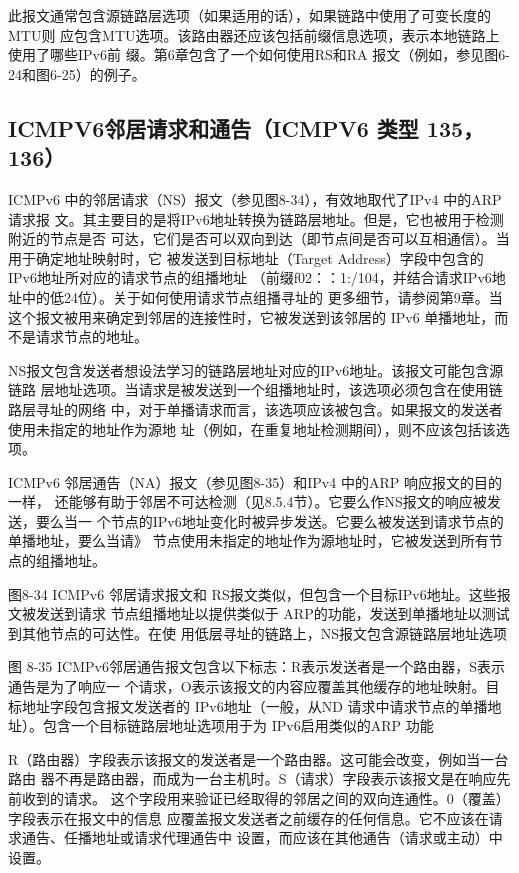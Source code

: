 此报文通常包含源链路层选项（如果适用的话），如果链路中使用了可变长度的MTU则
应包含MTU选项。该路由器还应该包括前缀信息选项，表示本地链路上使用了哪些IPv6前
缀。第6章包含了一个如何使用RS和RA 报文（例如，参见图6-24和图6-25）的例子。

\subsection{ICMPV6邻居请求和通告（ICMPV6 类型 135，136）}
ICMPv6 中的邻居请求（NS）报文（参见图8-34），有效地取代了IPv4 中的ARP请求报
文。其主要目的是将IPv6地址转换为链路层地址。但是，它也被用于检测附近的节点是否
可达，它们是否可以双向到达（即节点间是否可以互相通信）。当用于确定地址映射时，它
被发送到目标地址（Target Address）字段中包含的IPv6地址所对应的请求节点的组播地址
（前缀f02：：1:/104，并结合请求IPv6地址中的低24位）。关于如何使用请求节点组播寻址的
更多细节，请参阅第9章。当这个报文被用来确定到邻居的连接性时，它被发送到该邻居的
IPv6 单播地址，而不是请求节点的地址。

NS报文包含发送者想设法学习的链路层地址对应的IPv6地址。该报文可能包含源链路
层地址选项。当请求是被发送到一个组播地址时，该选项必须包含在使用链路层寻址的网络
中，对于单播请求而言，该选项应该被包含。如果报文的发送者使用未指定的地址作为源地
址（例如，在重复地址检测期间），则不应该包括该选项。

ICMPv6 邻居通告（NA）报文（参见图8-35）和IPv4 中的ARP 响应报文的目的一样，
还能够有助于邻居不可达检测（见8.5.4节）。它要么作NS报文的响应被发送，要么当一
个节点的IPv6地址变化时被异步发送。它要么被发送到请求节点的单播地址，要么当请》
节点使用未指定的地址作为源地址时，它被发送到所有节点的组播地址。

图8-34 ICMPv6 邻居请求报文和 RS报文类似，但包含一个目标IPv6地址。这些报文被发送到请求
节点组播地址以提供类似于 ARP的功能，发送到单播地址以测试到其他节点的可达性。在使
用低层寻址的链路上，NS报文包含源链路层地址选项

图 8-35
ICMPv6邻居通告报文包含以下标志：R表示发送者是一个路由器，S表示通告是为了响应一
个请求，O表示该报文的内容应覆盖其他缓存的地址映射。目标地址字段包含报文发送者的
IPv6地址（一般，从ND 请求中请求节点的单播地址）。包含一个目标链路层地址选项用于为
IPv6启用类似的ARP 功能

R（路由器）字段表示该报文的发送者是一个路由器。这可能会改变，例如当一台路由
器不再是路由器，而成为一台主机时。S（请求）字段表示该报文是在响应先前收到的请求。
这个字段用来验证已经取得的邻居之间的双向连通性。0（覆盖）字段表示在报文中的信息
应覆盖报文发送者之前缓存的任何信息。它不应该在请求通告、任播地址或请求代理通告中
设置，而应该在其他通告（请求或主动）中设置。

